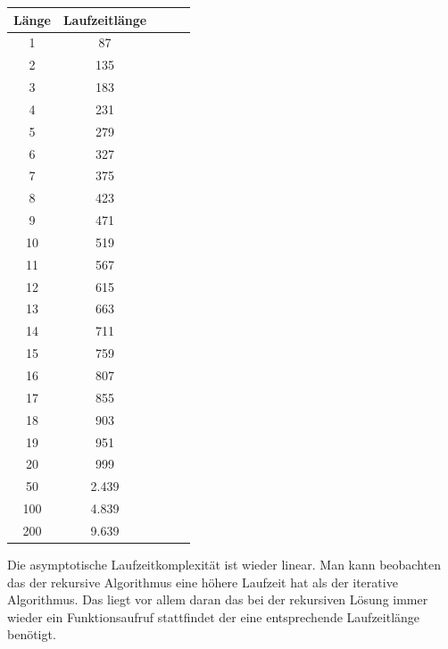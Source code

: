 \begin{center}
\begin{tabular}{|c|c|c|c|c|}
\hline
Länge    & Laufzeitlänge \\ \hline 
1     & 87 	\\ \hline 
2     & 135 	\\ \hline 
3     & 183 	\\ \hline 
4     & 231 	\\ \hline 
5     & 279 	\\ \hline 
6     & 327 	\\ \hline 
7     & 375 	\\ \hline 
8     & 423 	\\ \hline 
9     & 471 	\\ \hline 
10    & 519 	\\ \hline 
11    & 567 	\\ \hline 
12    & 615 	\\ \hline 
13    & 663 	\\ \hline 
14    & 711 	\\ \hline 
15    & 759 	\\ \hline 
16    & 807 	\\ \hline 
17    & 855 	\\ \hline 
18    & 903 	\\ \hline 
19    & 951 	\\ \hline 
20    & 999	    \\ \hline 
50    & 2.439	\\ \hline 
100   & 4.839	\\ \hline 
200	  & 9.639	\\ \hline 

\end{tabular}
\end{center}

\raggedright

Die asymptotische Laufzeitkomplexität ist wieder linear. Man kann beobachten das der rekursive Algorithmus eine höhere Laufzeit hat als der iterative Algorithmus. Das liegt vor allem daran das bei der rekursiven Lösung immer wieder ein Funktionsaufruf stattfindet der eine entsprechende Laufzeitlänge benötigt.